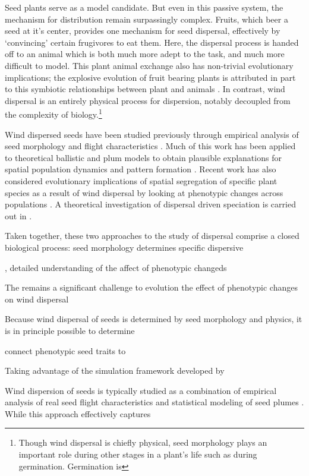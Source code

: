 \documentclass[annual]{acmsiggraph}
\begin{document}
Seed plants serve as a model candidate. But even in this passive system, the mechanism for distribution remain surpassingly complex.  Fruits, which beer a seed at it's center, provides one mechanism for seed dispersal, effectively by `convincing' certain frugivores  to eat them. Here, the dispersal process is handed off to an animal which is both much more adept to the task, and much more difficult to model. This plant animal exchange also has non-trivial evolutionary implications; the explosive evolution of fruit bearing plants is  attributed in part to this symbiotic relationships between plant and animals \cite{lorts2008}.  In contrast, wind dispersal is an entirely physical process for dispersion, notably decoupled from the complexity of biology.\footnote{Though wind dispersal is chiefly physical,  seed morphology  plays an important  role during other stages in a plant's life such as during germination. Germination is }

Wind dispersed seeds have been studied previously through empirical analysis of seed morphology and flight characteristics \cite{augspurger1986}.  Much of this work has been applied to  theoretical ballistic and plum models  to obtain plausible explanations for spatial population dynamics and pattern formation \cite{levin2003}. Recent work has also considered  evolutionary implications of spatial segregation of specific plant species as a result of wind dispersal by looking at phenotypic changes across  populations \cite{Cheptou2008}.   A theoretical investigation of dispersal driven speciation is carried out in \cite{levin2010}.  

Taken together, these two approaches to the study of dispersal comprise a closed biological process:  seed morphology determines specific dispersive 
  



, detailed understanding of the affect of phenotypic changeds    

The remains a significant challenge to evolution the effect of phenotypic changes on wind dispersal   


Because wind dispersal of seeds is determined by seed morphology and physics, it is in principle possible to determine 

 connect phenotypic seed traits to  

Taking advantage of the simulation framework developed by 




Wind dispersion of seeds is typically studied as a combination of empirical analysis of real seed flight characteristics and statistical modeling of seed plumes   .  While this approach effectively captures 
\end{document}
